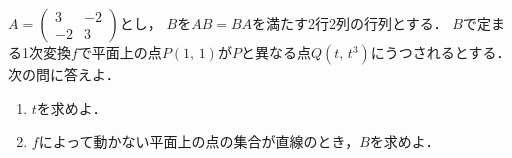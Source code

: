 \documentclass[../../main.tex]{subfiles}
\begin{document}
$A=
\begin{pmatrix} 3 & -2 \\ -2 & 3
\end{pmatrix}$とし，
$B$を$AB=BA$を満たす2行2列の行列とする．
$B$で定まる1次変換$f$で平面上の点$P(1, \, 1)$が$P$と異なる点$Q(t, \, t^3)$にうつされるとする．
次の問に答えよ．
\begin{enumerate}
  \item $t$を求めよ．
  \item $f$によって動かない平面上の点の集合が直線のとき，$B$を求めよ．
\end{enumerate}
\end{document}
